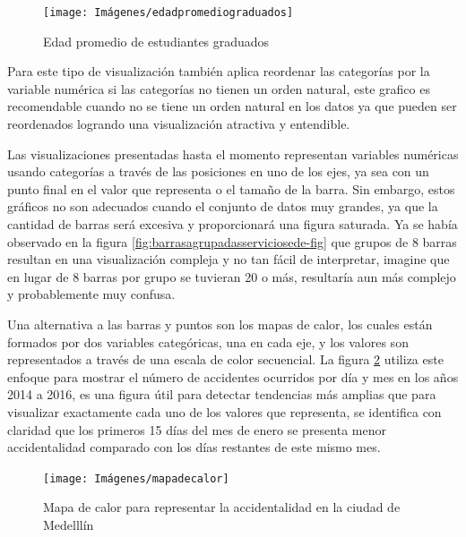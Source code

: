\documentclass[
]{book}
\begin{document}
\begin{figure}

{\centering \texttt{[image: Imágenes/edadpromediograduados]} 

}

\caption{Edad promedio de estudiantes graduados}\label{fig:barrasedadpromedio-fig}
\end{figure}

Para este tipo de visualización también aplica reordenar las categorías por la variable numérica si las categorías no tienen un orden natural, este grafico es recomendable cuando no se tiene un orden natural en los datos ya que pueden ser reordenados logrando una visualización atractiva y entendible.

Las visualizaciones presentadas hasta el momento representan variables numéricas usando categorías a través de las posiciones en uno de los ejes, ya sea con un punto final en el valor que representa o el tamaño de la barra. Sin embargo, estos gráficos no son adecuados cuando el conjunto de datos muy grandes, ya que la cantidad de barras será excesiva y proporcionará una figura saturada. Ya se había observado en la figura \ref{fig:barrasagrupadasserviciosede-fig} que grupos de 8 barras resultan en una visualización compleja y no tan fácil de interpretar, imagine que en lugar de 8 barras por grupo se tuvieran 20 o más, resultaría aun más complejo y probablemente muy confusa.

Una alternativa a las barras y puntos son los mapas de calor, los cuales están formados por dos variables categóricas, una en cada eje, y los valores son representados a través de una escala de color secuencial. La figura \ref{fig:mapadecalor-fig} utiliza este enfoque para mostrar el número de accidentes ocurridos por día y mes en los años 2014 a 2016, es una figura útil para detectar tendencias más amplias que para visualizar exactamente cada uno de los valores que representa, se identifica con claridad que los primeros 15 días del mes de enero se presenta menor accidentalidad comparado con los días restantes de este mismo mes.

\begin{figure}

{\centering \texttt{[image: Imágenes/mapadecalor]} 

}

\caption{Mapa de calor para representar la accidentalidad en la ciudad de Medelllín}\label{fig:mapadecalor-fig}
\end{figure}
\end{document}
